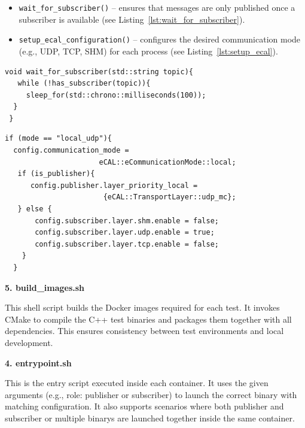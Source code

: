 \begin{itemize}
	\item \texttt{wait\_for\_subscriber()} – ensures that messages are only published once a subscriber is available (see Listing~\ref{lst:wait_for_subscriber}).
	\item \texttt{setup\_ecal\_configuration()} – configures the desired communication mode (e.g., UDP, TCP, SHM) for each process (see Listing~\ref{lst:setup_ecal}).
\end{itemize}

\begin{lstlisting}[style=cppstyle, caption={Simplified wait\_for\_subscriber logic}, label={lst:wait_for_subscriber}, captionpos=b]
 void wait_for_subscriber(std::string topic){
   while (!has_subscriber(topic)){
     sleep_for(std::chrono::milliseconds(100));
  }
 }
\end{lstlisting}

\begin{lstlisting}[style=cppstyle, caption={Partial example for UDP setup}, label={lst:setup_ecal}, captionpos=b]
 if (mode == "local_udp"){
  config.communication_mode = 
                      eCAL::eCommunicationMode::local;
   if (is_publisher){
      config.publisher.layer_priority_local = 
                       {eCAL::TransportLayer::udp_mc};
   } else {
       config.subscriber.layer.shm.enable = false;
       config.subscriber.layer.udp.enable = true;
       config.subscriber.layer.tcp.enable = false;
    }
  }
\end{lstlisting}

\vspace{1em}
\textbf{5. build\_images.sh}

\vspace{0.3em}
This shell script builds the Docker images required for each test. It invokes CMake to compile the C++ test binaries and packages them together with all dependencies. This ensures consistency between test environments and local development.

\vspace{1em}
\textbf{4. entrypoint.sh}

\vspace{0.3em}
This is the entry script executed inside each container. It uses the given arguments (e.g., role: publisher or subscriber) to launch the correct binary with matching configuration. It also supports scenarios where both publisher and subscriber or multiple binarys are launched together inside the same container.

